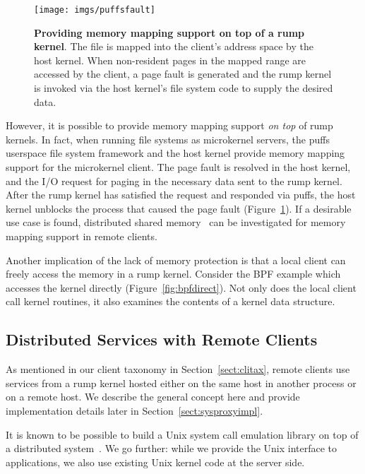 \begin{figure}[t]
\texttt{[image: imgs/puffsfault]}
\caption[Providing memory mapping support on top of a rump kernel]
{\textbf{Providing memory mapping support on top of a rump kernel}.
The file is mapped into the client's address space by the host kernel.
When non-resident pages in the mapped range are accessed by the client,
a page fault is generated and the rump kernel is invoked via
the host kernel's file system code to supply the desired data.}
\label{fig:puffsmmap}
\end{figure}

However, it is possible to provide memory
mapping support \textit{on top} of rump kernels.  In fact, when running
file systems as microkernel servers, the puffs~\cite{kantee:puffs}
userspace file system framework and the host kernel provide memory
mapping support for the microkernel client.  The page fault is resolved
in the host kernel, and the I/O request for paging in the necessary data
sent to the rump kernel.  After the rump kernel has satisfied the request
and responded via puffs, the host kernel unblocks the process that caused
the page fault (Figure~\ref{fig:puffsmmap}).  If a desirable use case is
found, distributed shared memory~\cite{minnich:mether} can be investigated
for memory mapping support in remote clients.

Another implication of the lack of memory protection is that a
local client can freely access the memory in a rump kernel.
Consider the BPF example which accesses the kernel directly
(Figure~\ref{fig:bpfdirect}).  Not only does the local client call
kernel routines, it also examines the contents of a kernel data
structure.

\subsection{Distributed Services with Remote Clients}
\label{sect:distributed}

As mentioned in our client taxonomy in Section~\ref{sect:clitax},
remote clients use services from a rump kernel hosted either on
the same host in another process or on a remote host.  We describe
the general concept here and provide implementation details later
in Section~\ref{sect:sysproxyimpl}.

It is known to be possible to build a Unix system call emulation
library on top of a distributed system~\cite{mullender:amoeba}.
We go further: while we provide the Unix interface to applications,
we also use existing Unix kernel code at the server side.

